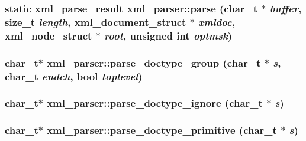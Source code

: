 \hypertarget{structxml__parser_4bf0acd166edf3fc6cc9543002ff6f5d}{
\subsubsection[parse]{\setlength{\rightskip}{0pt plus 5cm}static xml\_\-parse\_\-result xml\_\-parser::parse (char\_\-t $\ast$ {\em buffer}, size\_\-t {\em length}, \hyperlink{structxml__document__struct}{xml\_\-document\_\-struct} $\ast$ {\em xmldoc}, xml\_\-node\_\-struct $\ast$ {\em root}, unsigned int {\em optmsk})}}
\label{structxml__parser_4bf0acd166edf3fc6cc9543002ff6f5d}


\hypertarget{structxml__parser_9bc0e5f3d75cd7edb267a85430e1cdfc}{
\subsubsection[parse\_\-doctype\_\-group]{\setlength{\rightskip}{0pt plus 5cm}char\_\-t$\ast$ xml\_\-parser::parse\_\-doctype\_\-group (char\_\-t $\ast$ {\em s}, char\_\-t {\em endch}, bool {\em toplevel})}}
\label{structxml__parser_9bc0e5f3d75cd7edb267a85430e1cdfc}


\hypertarget{structxml__parser_1e996ac9c9993f1939128859596376a1}{
\subsubsection[parse\_\-doctype\_\-ignore]{\setlength{\rightskip}{0pt plus 5cm}char\_\-t$\ast$ xml\_\-parser::parse\_\-doctype\_\-ignore (char\_\-t $\ast$ {\em s})}}
\label{structxml__parser_1e996ac9c9993f1939128859596376a1}


\hypertarget{structxml__parser_722853b603ad9a1d1f61bb8115bea5b4}{
\subsubsection[parse\_\-doctype\_\-primitive]{\setlength{\rightskip}{0pt plus 5cm}char\_\-t$\ast$ xml\_\-parser::parse\_\-doctype\_\-primitive (char\_\-t $\ast$ {\em s})}}
\label{structxml__parser_722853b603ad9a1d1f61bb8115bea5b4}


